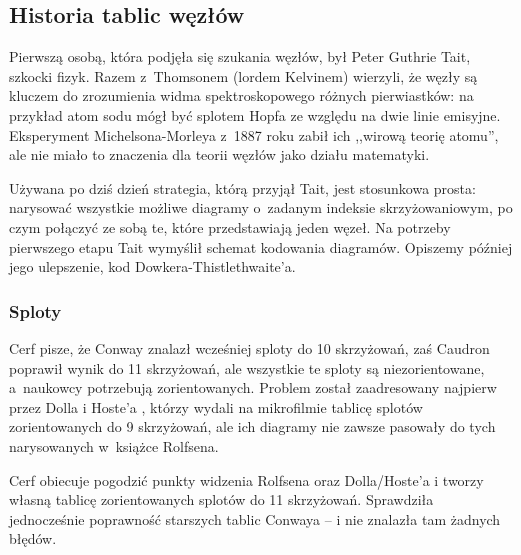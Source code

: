 
\subsection{Historia tablic węzłów}
Pierwszą osobą, która podjęła się szukania węzłów, był Peter Guthrie Tait, szkocki fizyk.
%
Razem z~Thomsonem (lordem Kelvinem) wierzyli, że węzły są kluczem do zrozumienia widma spektroskopowego różnych pierwiastków: na przykład atom sodu mógł być splotem Hopfa ze względu na dwie linie emisyjne.
%
Eksperyment Michelsona-Morleya z~1887 roku zabił ich ,,wirową teorię atomu'', ale nie miało to znaczenia dla teorii węzłów jako działu matematyki.

Używana po dziś dzień strategia, którą przyjął Tait, jest stosunkowa prosta: narysować wszystkie możliwe diagramy o~zadanym indeksie skrzyżowaniowym, po czym połączyć ze sobą te, które przedstawiają jeden węzeł.
Na potrzeby pierwszego etapu Tait wymyślił schemat kodowania diagramów.
Opiszemy później jego ulepszenie, kod Dowkera-Thistlethwaite'a.













\subsubsection{Sploty}
Cerf \cite{cerf98} pisze, że Conway \cite{conway70} znalazł wcześniej sploty do 10 skrzyżowań, zaś Caudron \cite{caudron82} poprawił wynik do 11 skrzyżowań, ale wszystkie te sploty są niezorientowane, a~naukowcy potrzebują zorientowanych.
%
%
%
Problem został zaadresowany najpierw przez Dolla i Hoste'a \cite{doll91}, którzy wydali na mikrofilmie tablicę splotów zorientowanych do 9 skrzyżowań, ale ich diagramy nie zawsze pasowały do tych narysowanych w~książce Rolfsena.
%
%

Cerf obiecuje pogodzić punkty widzenia Rolfsena oraz Dolla/Hoste'a i tworzy własną tablicę zorientowanych splotów do 11 skrzyżowań.
Sprawdziła jednocześnie poprawność starszych tablic Conwaya -- i nie znalazła tam żadnych błędów.

